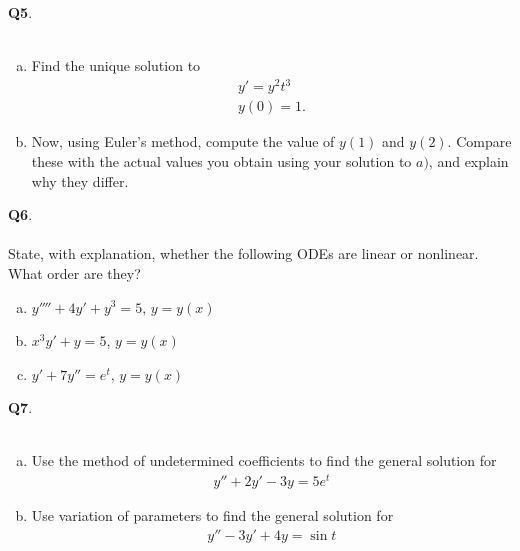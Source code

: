 \documentclass[12pt, oneside]{amsart}
\begin{document}
\noindent
\textbf{Q5}. \\ \\ 
\begin{enumerate}[a)]
	\item
Find the unique solution to
\begin{align*}
y' = y^2 t^3 \\
y(0)=1.
\end{align*}
\vspace{3in}
\item
Now, using Euler's method, compute the value
of $y(1)$ and $y(2)$. Compare these
with the actual values you obtain using your
solution to $a)$, and explain why they differ.
\end{enumerate}
\newpage
\noindent
\textbf{Q6}. \\ \\ 
State, with explanation, whether the following ODEs are linear or nonlinear. What order are they?

\vspace{1in}
\begin{enumerate}[a)]
    \item
        $y'''' + 4y' + y^{3} = 5$, \quad $y = y(x)$
        \vspace{2in}

    \item
        $x^3y' + y = 5$, \quad $y = y(x)$
        \vspace{2in}

    \item 
        $y' + 7y'' = e^t$, \quad $y = y(x)$
        \vspace{2in}
\end{enumerate}
\newpage
\textbf{Q7}. \\ \\ 
\begin{enumerate}[a)]
	\item
Use the method of undetermined coefficients to find the
general solution for
\begin{align*}
y'' + 2y' -3y = 5e^t
\end{align*}
\vspace{3in}
\item

Use variation of parameters to find the general solution for
\begin{align*}
y'' -3y' + 4y = \sin t
\end{align*}
\end{enumerate}
\end{document}
